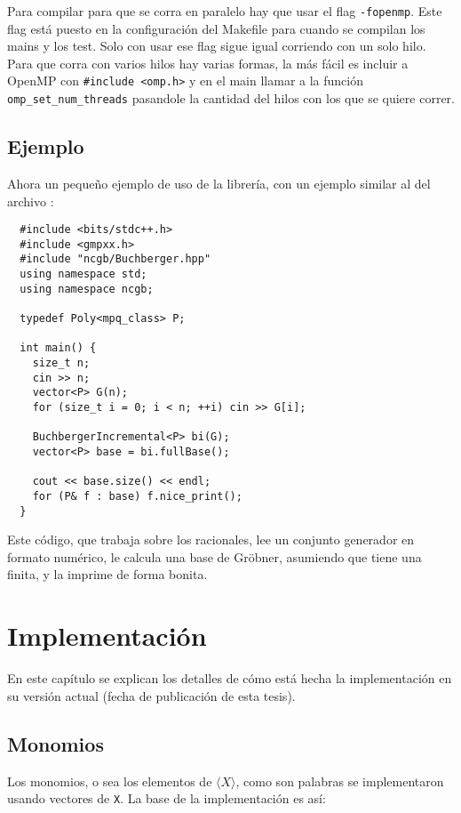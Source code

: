 \documentclass[12pt]{report}
\theoremstyle{customstyle}
\theoremstyle{factstyle}
\begin{document}
Para compilar para que se corra en paralelo hay que usar el flag \texttt{-fopenmp}. Este flag está puesto en la configuración del Makefile para cuando se compilan los mains y los test. Solo con usar ese flag sigue igual corriendo con un solo hilo. Para que corra con varios hilos hay varias formas, la más fácil es incluir a OpenMP con \texttt{\#include <omp.h>} y en el main llamar a la función \texttt{omp\_set\_num\_threads} pasandole la cantidad del hilos con los que se quiere correr.


\section{Ejemplo}

Ahora un pequeño ejemplo de uso de la librería, con un ejemplo similar al del archivo :

\begin{verbatim}
  #include <bits/stdc++.h>
  #include <gmpxx.h>
  #include "ncgb/Buchberger.hpp"
  using namespace std;
  using namespace ncgb;

  typedef Poly<mpq_class> P;

  int main() {
    size_t n;
    cin >> n;
    vector<P> G(n);
    for (size_t i = 0; i < n; ++i) cin >> G[i];

    BuchbergerIncremental<P> bi(G);
    vector<P> base = bi.fullBase();

    cout << base.size() << endl;
    for (P& f : base) f.nice_print();
  }
\end{verbatim}

Este código, que trabaja sobre los racionales, lee un conjunto generador en formato numérico, le calcula una base de Gröbner, asumiendo que tiene una finita, y la imprime de forma bonita.


\chapter{Implementación}

En este capítulo se explican los detalles de cómo está hecha la implementación en su versión actual (fecha de publicación de esta tesis).

\section{Monomios}

Los monomios, o sea los elementos de $⟨X⟩$, como son palabras se implementaron usando vectores de \texttt{X}. La base de la implementación es así:
\end{document}
